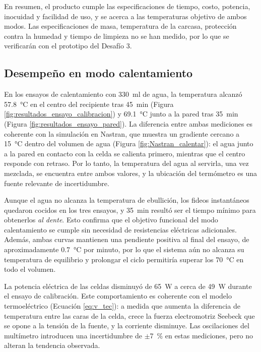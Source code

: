\documentclass[12pt, a4paper]{article}
\begin{document}
En resumen, el producto cumple las especificaciones de tiempo, costo, potencia, inocuidad y facilidad de uso, y se acerca a las temperaturas objetivo de ambos modos. Las especificaciones de masa, temperatura de la carcasa, protección contra la humedad y tiempo de limpieza no se han medido, por lo que se verificarán con el prototipo del Desafío 3.

\subsection{Desempeño en modo calentamiento}

En los ensayos de calentamiento con \SI{330}{\ml} de agua, la temperatura alcanzó \SI{57,8}{\celsius} en el centro del recipiente tras \SI{45}{\minute} (Figura \ref{fig:resultados_ensayo_calibracion}) y \SI{69,1}{\celsius} junto a la pared tras \SI{35}{\minute} (Figura \ref{fig:resultados_ensayo_pared}). La diferencia entre ambas mediciones es coherente con la simulación en Nastran, que muestra un gradiente cercano a \SI{15}{\celsius} dentro del volumen de agua (Figura \ref{fig:Nastran_calentar}): el agua junto a la pared en contacto con la celda se calienta primero, mientras que el centro responde con retraso. Por lo tanto, la temperatura del agua al servirla, una vez mezclada, se encuentra entre ambos valores, y la ubicación del termómetro es una fuente relevante de incertidumbre.

Aunque el agua no alcanza la temperatura de ebullición, los fideos instantáneos quedaron cocidos en los tres ensayos, y \SI{35}{\minute} resultó ser el tiempo mínimo para obtenerlos \textit{al dente}. Esto confirma que el objetivo funcional del modo calentamiento se cumple sin necesidad de resistencias eléctricas adicionales. Además, ambas curvas mantienen una pendiente positiva al final del ensayo, de aproximadamente \SI{0,7}{\celsius} por minuto, por lo que el sistema aún no alcanza su temperatura de equilibrio y prolongar el ciclo permitiría superar los \SI{70}{\celsius} en todo el volumen.

La potencia eléctrica de las celdas disminuyó de \SI{65}{\watt} a cerca de \SI{49}{\watt} durante el ensayo de calibración. Este comportamiento es coherente con el modelo termoeléctrico (Ecuación \eqref{eq:v_tec}): a medida que aumenta la diferencia de temperatura entre las caras de la celda, crece la fuerza electromotriz Seebeck que se opone a la tensión de la fuente, y la corriente disminuye. Las oscilaciones del multímetro introducen una incertidumbre de $\pm$\SI{7}{\percent} en estas mediciones, pero no alteran la tendencia observada.
\end{document}
